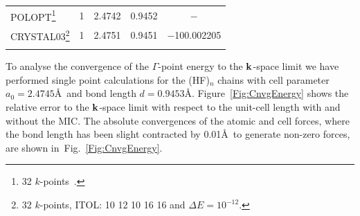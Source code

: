 \documentclass[prl,twocolumn,showpacs,twocolumngrid,superbib]{revtex4}
\begin{document}
\begin{table}[t]
\begin{tabular}{lrllc}
%
    \hline
    {\sc POLOPT}\footnote[2]{32 $k$-points~\cite{DJacquemin99B}.} 
    & 1 & 2.4742 & 0.9452  & $-$\\
    {\sc CRYSTAL03}\footnote[3]{32 $k$-points, ITOL: 10 12 10 16 16 and $\Delta E=10^{-12}$.}
    & 1 & 2.4751 & 0.9451 & $-$100.002205\\
    \botrule
  \end{tabular}
\end{table}

To analyse the convergence of the $\Gamma$-point energy to the ${\bf k}$-space limit
we have performed single point calculations for the 
(HF)$_n$ chains with cell parameter $a_0=2.4745$\AA~and bond length $d=0.9453$\AA.
Figure~\ref{Fig:CnvgEnergy} shows the relative error to the ${\bf k}$-space limit
with respect to the unit-cell length with and without the MIC.
The absolute convergences of the atomic and cell forces, where
the bond length has been slight contracted by 0.01\AA~to generate 
non-zero forces, are shown in~Fig.~\ref{Fig:CnvgEnergy}.
\end{document}
